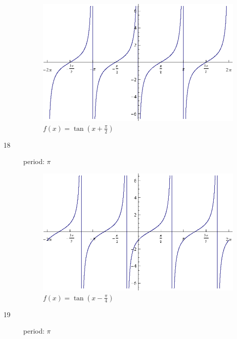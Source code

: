 \documentclass{exam}
\begin{document}
\begin{description}
        \begin{figure}[H]
          \centering
          \includegraphics[scale=0.8]{exercise17.eps}
          \caption{$f(x) = \tan \left( x + \frac{\pi}{2} \right)$}
        \end{figure}

      \item[18]
        period: $\pi$

        \begin{figure}[H]
          \centering
          \includegraphics[scale=0.8]{exercise18.eps}
          \caption{$f(x) = \tan \left( x - \frac{\pi}{4} \right)$}
        \end{figure}

      \item[19]
        period: $\pi$


\end{description}
\end{document}
